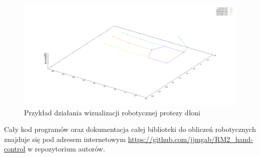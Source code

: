 \documentclass[polish,polish]{article}
\begin{document}
\begin{figure}[H]
\centering
\includegraphics[width=.7\textwidth]{plot2.png} 
\caption{Przykład działania wizualizacji robotycznej protezy dłoni}
\label{fig:proteza2}
\end{figure}

Cały kod programów oraz dokumentacja całej biblioteki do obliczeń robotycznych znajduje się pod adresem internetowym \url{https://github.com/jjmgab/RM2_hand-control} w repozytorium autorów.

\newpage
 

\end{document}
